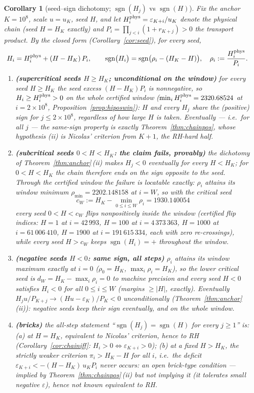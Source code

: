 \documentclass[11pt]{article}
\newtheorem{corollary}[theorem]{Corollary}
\theoremstyle{remark}
\newcommand{\eps}{\varepsilon}
\DeclareMathOperator{\sgn}{sgn}
\begin{document}
\begin{corollary}[seed--sign dichotomy; $\sgn(H_j)$ vs $\sgn(H)$]\label{cor:sgnsame}
Fix the anchor $K=10^8$, scale $u=u_K$, seed $H$, and let $H^{\rm phys}_i
=\eps_{K+i}/u_K$ denote the physical chain (seed $H=H_K$ exactly) and
$P_i=\prod_{j<i}(1+r_{K+j})>0$ the transport product. By the closed form
(Corollary~\ref{cor:seed}), for every seed,
\[
H_i=H^{\rm phys}_i+(H-H_K)\,P_i,\qquad
\sgn\bigl(H_i\bigr)=\sgn\bigl(\rho_i-(H_K-H)\bigr),
\quad \rho_i:=\frac{H^{\rm phys}_i}{P_i}.
\]
\begin{enumerate}
\item \textbf{(supercritical seeds $H\ge H_K$; unconditional on the window)}
for every seed $H\ge H_K$ the seed excess $(H-H_K)P_i$ is nonnegative, so
$H_i\ge H^{\rm phys}_i>0$ on the whole certified window ($\min_i
H^{\rm phys}_i=2320.68524$ at $i=2\times10^8$, Proposition~\ref{prop:hiposwin}):
$H$ and every $H_j$ share the (positive) sign for $j\le 2\times10^8$,
regardless of how large $H$ is taken. Eventually --- i.e.\ for all $j$ ---
the same-sign property is exactly Theorem~\ref{thm:chainpos}, whose
hypothesis (ii) is Nicolas' criterion from $K+1$, the RH-hard half.
\item \textbf{(subcritical seeds $0<H<H_K$: the claim fails, provably)}
the dichotomy of Theorem~\ref{thm:anchor}\,(ii) makes $H_j<0$ eventually
for every $H<H_K$; for $0<H<H_K$ the chain therefore ends on the sign
\emph{opposite} to the seed. Through the certified window the failure is
locatable exactly: $\rho_i$ attains its window minimum
$\rho_{\min}=2202.148158$ at $i=W$, so with the \emph{critical seed}
\[
c_W:=H_K-\min_{0\le i\le W}\rho_i=1930.140054
\]
every seed $0<H<c_W$ flips nonpositively \emph{inside} the window
(certified flip indices: $H=1$ at $i=42\,993$, $H=100$ at
$i=4\,373\,363$, $H=1000$ at $i=61\,006\,410$, $H=1900$ at
$i=191\,615\,334$, each with zero re-crossings), while every seed
$H>c_W$ keeps $\sgn(H_i)=+$ throughout the window.
\item \textbf{(negative seeds $H<0$: same sign, all steps)}
$\rho_i$ attains its window maximum exactly at $i=0$
($\rho_0=H_K$, $\max_i\rho_i=H_K$), so the lower critical seed is
$d_W=H_K-\max_{i}\rho_i=0$ to machine precision and every seed $H<0$
satisfies $H_i<0$ for all $0\le i\le W$ (margins $\ge|H|$, exactly).
Eventually $H_j u/P_{K+j}\to(Hu-\eps_K)/P_K<0$ unconditionally
(Theorem~\ref{thm:anchor}\,(ii)): negative seeds keep their sign
eventually, and on the whole window.
\item \textbf{(bricks)} the all-step statement ``$\sgn(H_j)=\sgn(H)$ for
every $j\ge1$'' is: (a) at $H=H_K$, equivalent to Nicolas' criterion, hence
to RH (Corollary~\ref{cor:chainiff}: $H_i>0\iff\eps_{K+i}>0$); (b) at a
fixed $H>H_K$, the strictly weaker criterion $\pi_i>H_K-H$ for all $i$,
i.e.\ the deficit $\eps_{K+i}<-(H-H_K)\,u_KP_i$ never occurs: an open
brick-type condition --- implied by Theorem~\ref{thm:chainpos}\,(ii) but
not implying it (it tolerates small negative $\eps$), hence not known
equivalent to RH.
\end{enumerate}
\end{corollary}
\end{document}
